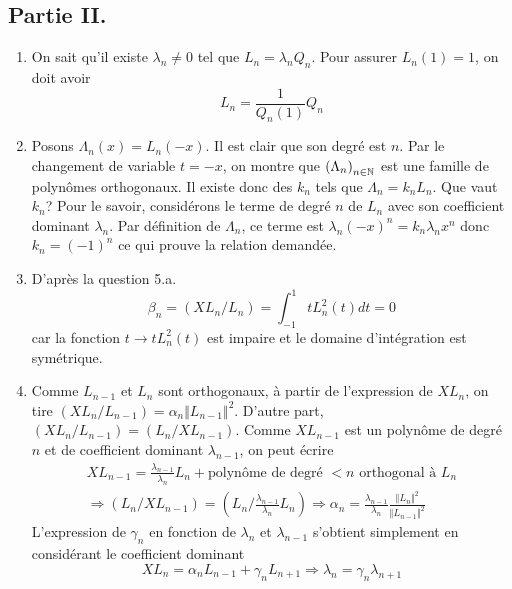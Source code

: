 \subsection*{Partie II.}
\begin{enumerate}
 \item On sait qu'il existe $\lambda_n\neq 0$ tel que $L_n=\lambda_nQ_n$. Pour assurer $L_n(1)=1$, on doit avoir 
\begin{displaymath}
L_n = \frac{1}{Q_n(1)}Q_n 
\end{displaymath}
 \item Posons $\Lambda_n(x)=L_n(-x)$. Il est clair que son degré est $n$. Par le changement de variable $t=-x$, on montre que $\left( \Lambda_n\right) _{n\in \mathbb{N}}$ est une famille de polynômes orthogonaux. Il existe donc des $k_n$ tels que $\Lambda_n = k_n L_n$. Que vaut $k_n$? Pour le savoir, considérons le terme de degré $n$ de $L_n$ avec son coefficient dominant $\lambda_n$. Par définition de $\Lambda_n$, ce terme est $\lambda_n(-x)^n = k_n\lambda_nx^n$ donc $k_n=(-1)^n$ ce qui prouve la relation demandée.

\item D'après la question 5.a.
\begin{displaymath}
 \beta_n = (XL_n/L_n)=\int_{-1}^{1}tL_n^2(t)dt = 0
\end{displaymath}
car la fonction $t\rightarrow tL_n^2(t)$ est impaire et le domaine d'intégration est symétrique.

 \item Comme $L_{n-1}$ et $L_n$ sont orthogonaux, à partir de l'expression de $XL_n$, on tire $(XL_n/L_{n-1})=\alpha_n\Vert L_{n-1}\Vert^2$. D'autre part, $(XL_n/L_{n-1})= (L_n/XL_{n-1})$.  Comme $XL_{n-1}$ est un polynôme de degré $n$ et de coefficient dominant $\lambda_{n-1}$, on peut écrire
\begin{multline*}
 XL_{n-1}=\frac{\lambda_{n-1}}{\lambda_n}L_n+\text{polynôme de degré $<n$ orthogonal à $L_n$}\\
\Rightarrow
(L_n/XL_{n-1})=(L_n/\frac{\lambda_{n-1}}{\lambda_n}L_n)
\Rightarrow
\alpha_n = \frac{\lambda_{n-1}}{\lambda_n}\frac{\Vert L_n\Vert^2}{\Vert L_{n-1}\Vert^2}
\end{multline*}
L'expression de $\gamma_n$ en fonction de $\lambda_n$ et $\lambda_{n-1}$ s'obtient simplement en considérant le coefficient dominant
\begin{displaymath}
 XL_n=\alpha_nL_{n-1}+\gamma_nL_{n+1}\Rightarrow 
\lambda_n = \gamma_n \lambda_{n+1}
\end{displaymath}


\end{enumerate}
